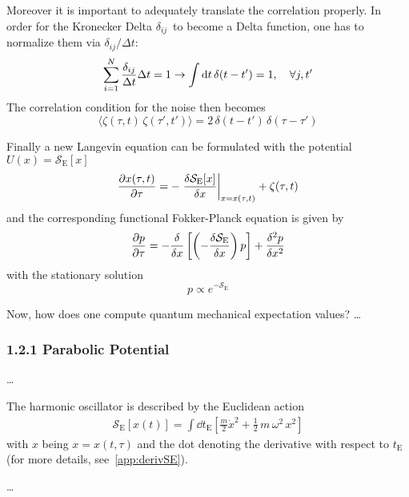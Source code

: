 \documentclass[11pt,a4paper]{scrartcl}
\newcommand{\action}{\ensuremath{\mathcal{S}}}
\newcommand{\deltaij}{\ensuremath{\delta_{ij}}}
\newcommand{\OverDeltaT}[1]{\ensuremath{\frac{#1}{\Delta t}}}
\newcommand{\SE}{\ensuremath{\mathcal{S}_{\mathrm{E}}}}
\begin{document}
Moreover it is important to adequately translate the correlation properly. In
order for the Kronecker Delta \deltaij~to become a Delta function, one has to
normalize them via $\deltaij/\Delta{t}$:
\begin{equation}
    \sum_{i=1}^{N}\OverDeltaT{\deltaij}\Delta{t}=1\to\int\dd{t}\delta(t-t')=1\qc\forall{j,t'}
\end{equation}
The correlation condition for the noise then becomes
\begin{equation}
    \langle\zeta(\tau,t)\,\zeta(\tau',t')\rangle=2\,\delta(t-t')\,\delta(\tau-\tau')
\end{equation}

Finally a new Langevin equation can be formulated with the potential
$U(x)=\SE[x]$
\begin{equation}
    \pdv{x(\tau,t)}{\tau}=-\eval{\fdv{\SE[x]}{x}}_{x=x(\tau,t)}+\zeta(\tau,t)
    \label{eq:SQMLangevin}
\end{equation}
and the corresponding functional Fokker-Planck equation is given by
\begin{equation}
    \pdv{p}{\tau}=-\fdv{x}\left[\left(-\fdv{\SE}{x}\right)p\right]+\fdv[2]{p}{x}
\end{equation}
with the stationary solution
\begin{equation}
    p\propto{e^{-\SE}}
\end{equation}

Now, how does one compute quantum mechanical expectation values? \ldots


\subsubsection*{1.2.1 Parabolic Potential}
\dots

The harmonic oscillator is described by the Euclidean action
\begin{align}
    \action_\mathrm{E}\left[x(t)\right] =
    \int\dd{t_\mathrm{E}}\left[\frac{m}{2}\dot{x}^2 +
        \frac{1}{2}\,m\,\omega^2\,x^2\right]
\end{align}
with $x$ being $x = x(t, \tau )$ and the dot denoting the derivative with
respect to $t_\mathrm{E}$ (for more details, see~\ref{app:derivSE}).

\dots
\end{document}
